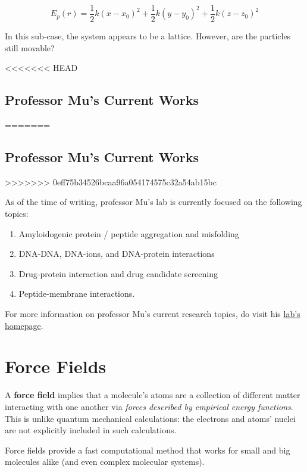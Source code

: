 \documentclass[
  letterpaper,
  DIV=11,
  numbers=noendperiod]{scrreprt}
\providecommand{\tightlist}{%
  \setlength{\itemsep}{0pt}\setlength{\parskip}{0pt}}\usepackage{longtable,booktabs,array}
\begin{document}
\begin{equation}
E_p(r) = \frac{1}{2}k(x - x_0)^2 + \frac{1}{2}k(y - y_0)^2 + \frac{1}{2}k(z - z_0)^2
\end{equation}

In this sub-case, the system appears to be a lattice. However, are the
particles still movable?

<<<<<<< HEAD
\hypertarget{professor-mus-current-works-1}{%
\section{Professor Mu's Current
Works}\label{professor-mus-current-works-1}}
=======
\hypertarget{professor-mus-current-works}{%
\section{Professor Mu's Current
Works}\label{professor-mus-current-works}}
>>>>>>> 0eff75b34526bcaa96a054174575c32a54ab15bc

As of the time of writing, professor Mu's lab is currently focused on
the following topics:

\begin{enumerate}
\def\labelenumi{\arabic{enumi}.}
\tightlist
\item
  Amyloidogenic protein / peptide aggregation and misfolding
\item
  DNA-DNA, DNA-ions, and DNA-protein interactions
\item
  Drug-protein interaction and drug candidate screening
\item
  Peptide-membrane interactions.
\end{enumerate}

For more information on professor Mu's current research topics, do visit
his
\href{https://www.ntu.edu.sg/sbs/research/research-directory/Mu-Yuguang}{lab's
homepage}.

\hypertarget{force-fields}{%
\chapter{Force Fields}\label{force-fields}}

A \textbf{force field} implies that a molecule's atoms are a collection
of different matter interacting with one another via \emph{forces
described by empirical energy functions}. This is unlike quantum
mechanical calculations: the electrons and atoms' nuclei are not
explicitly included in such calculations.

Force fields provide a fast computational method that works for small
and big molecules alike (and even complex molecular systems).
\end{document}
